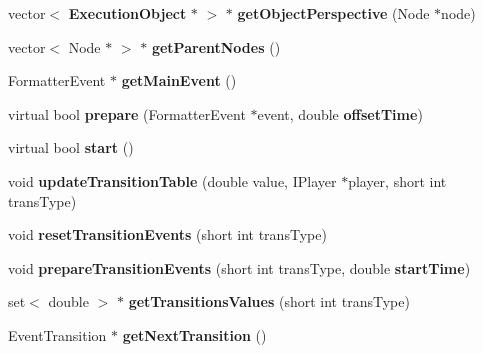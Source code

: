 \begin{CompactItemize}
\item 
vector$<$ {\bf ExecutionObject} $\ast$ $>$ $\ast$ \textbf{getObjectPerspective} (Node $\ast$node)\label{classbr_1_1pucrio_1_1telemidia_1_1ginga_1_1ncl_1_1model_1_1components_1_1ExecutionObject_cf6668a3d77d4814620a25c4e7e07a27}

\item 
vector$<$ Node $\ast$ $>$ $\ast$ \textbf{getParentNodes} ()\label{classbr_1_1pucrio_1_1telemidia_1_1ginga_1_1ncl_1_1model_1_1components_1_1ExecutionObject_1532dd6225a67520349075d7c9b169f7}

\item 
FormatterEvent $\ast$ \textbf{getMainEvent} ()\label{classbr_1_1pucrio_1_1telemidia_1_1ginga_1_1ncl_1_1model_1_1components_1_1ExecutionObject_d4b07e1f4601735c08f7f51a9ba3ef06}

\item 
virtual bool \textbf{prepare} (FormatterEvent $\ast$event, double {\bf offsetTime})\label{classbr_1_1pucrio_1_1telemidia_1_1ginga_1_1ncl_1_1model_1_1components_1_1ExecutionObject_715e5afd17d9d9a4912f6cbf64a9936a}

\item 
virtual bool \textbf{start} ()\label{classbr_1_1pucrio_1_1telemidia_1_1ginga_1_1ncl_1_1model_1_1components_1_1ExecutionObject_2a1dbe283ac44900c920f3f79339f9f6}

\item 
void \textbf{updateTransitionTable} (double value, IPlayer $\ast$player, short int transType)\label{classbr_1_1pucrio_1_1telemidia_1_1ginga_1_1ncl_1_1model_1_1components_1_1ExecutionObject_9ede30929c36ee367e81fab88f0c7d38}

\item 
void \textbf{resetTransitionEvents} (short int transType)\label{classbr_1_1pucrio_1_1telemidia_1_1ginga_1_1ncl_1_1model_1_1components_1_1ExecutionObject_a95e5609f21f578b351f151a0d147886}

\item 
void \textbf{prepareTransitionEvents} (short int transType, double {\bf startTime})\label{classbr_1_1pucrio_1_1telemidia_1_1ginga_1_1ncl_1_1model_1_1components_1_1ExecutionObject_37c4992311b3fe947ec6967de487b36a}

\item 
set$<$ double $>$ $\ast$ \textbf{getTransitionsValues} (short int transType)\label{classbr_1_1pucrio_1_1telemidia_1_1ginga_1_1ncl_1_1model_1_1components_1_1ExecutionObject_b95e66d70023507acc899a8737fb6629}

\item 
EventTransition $\ast$ \textbf{getNextTransition} ()\label{classbr_1_1pucrio_1_1telemidia_1_1ginga_1_1ncl_1_1model_1_1components_1_1ExecutionObject_21da02e4924dff20852c1e00ac451e9e}


\end{CompactItemize}
